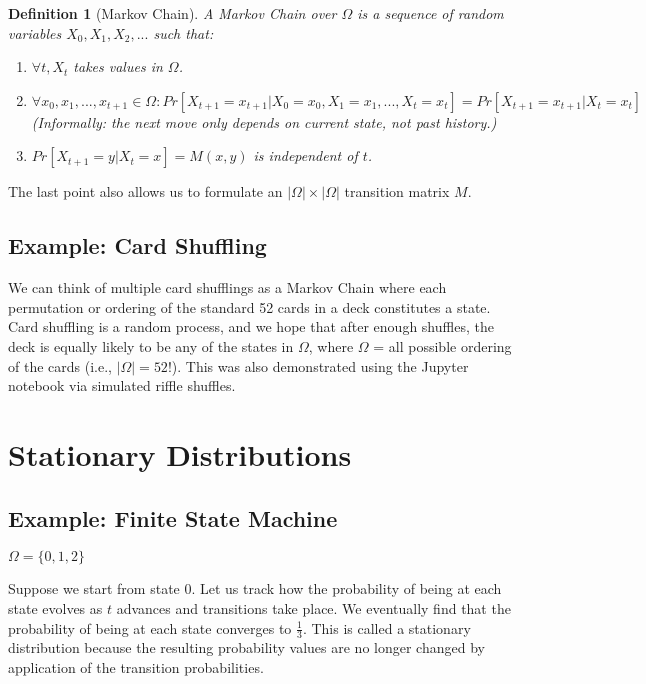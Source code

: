 \documentclass[twoside]{article}
\newtheorem{definition}[theorem]{Definition}
\begin{document}
\begin{definition}[Markov Chain]
   A Markov Chain over $\Omega$ is a sequence of random variables $X_0, X_1, X_2, ...$ such that:
   \begin{enumerate}
      \item $\forall t, X_t$ takes values in $\Omega$.
      \item $\forall x_0, x_1, ..., x_{t+1} \in \Omega: Pr[X_{t+1} = x_{t+1}|X_0 = x_0, X_1 = x_1, ..., X_t = x_t] = Pr[X_{t+1} = x_{t+1}|X_t = x_t]$ \\
      (Informally: the next move only depends on current state, not past history.)
      \item $Pr[X_{t+1} = y|X_t = x] = M(x, y)$ is independent of $t$.
   \end{enumerate}
\end{definition}

The last point also allows us to formulate an $|\Omega| \times |\Omega|$ transition matrix $M$.

\subsection{Example: Card Shuffling}

We can think of multiple card shufflings as a Markov Chain where each permutation or ordering of the standard 52 cards in a deck constitutes a state. Card shuffling is a random process, and we hope that after enough shuffles, the deck is equally likely to be any of the states in $\Omega$, where $\Omega$ = all possible ordering of the cards (i.e., $|\Omega| = 52!$). This was also demonstrated using the Jupyter notebook via simulated riffle shuffles.


\section{Stationary Distributions}

\subsection{Example: Finite State Machine}

$\Omega = \{0, 1, 2\}$

Suppose we start from state 0. Let us track how the probability of being at each state evolves as $t$ advances and transitions take place. We eventually find that the probability of being at each state converges to $\frac{1}{3}$. This is called a stationary distribution because the resulting probability values are no longer changed by application of the transition probabilities.
\end{document}
